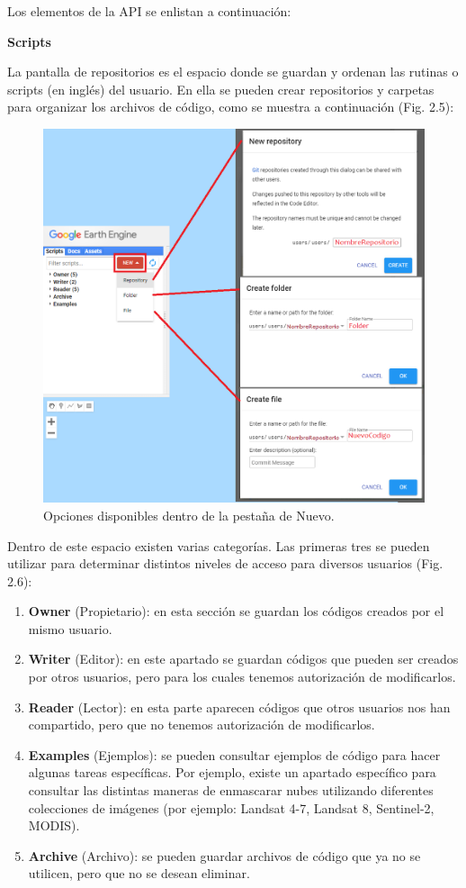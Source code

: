 \documentclass[
  12pt,
  letterpaper,
  twoside]{book}
\providecommand{\tightlist}{%
  \setlength{\itemsep}{0pt}\setlength{\parskip}{0pt}}
\begin{document}
Los elementos de la API se enlistan a continuación:

\textbf{Scripts}

La pantalla de repositorios es el espacio donde se guardan y ordenan las rutinas o scripts (en inglés) del usuario. En ella se pueden crear repositorios y carpetas para organizar los archivos de código, como se muestra a continuación (Fig. 2.5):

\begin{figure}[btp]

{\centering \includegraphics[width=0.8\linewidth]{Img/repofolderfile} 

}

\caption{Opciones disponibles dentro de la pestaña de Nuevo.}\label{fig:unnamed-chunk-6}
\end{figure}

Dentro de este espacio existen varias categorías. Las primeras tres se pueden utilizar para determinar distintos niveles de acceso para diversos usuarios (Fig. 2.6):

\begin{enumerate}
\def\labelenumi{\arabic{enumi}.}
\tightlist
\item
  \textbf{Owner} (Propietario): en esta sección se guardan los códigos creados por el mismo usuario.
\item
  \textbf{Writer} (Editor): en este apartado se guardan códigos que pueden ser creados por otros usuarios, pero para los cuales tenemos autorización de modificarlos.
\item
  \textbf{Reader} (Lector): en esta parte aparecen códigos que otros usuarios nos han compartido, pero que no tenemos autorización de modificarlos.
\item
  \textbf{Examples} (Ejemplos): se pueden consultar ejemplos de código para hacer algunas tareas específicas. Por ejemplo, existe un apartado específico para consultar las distintas maneras de enmascarar nubes utilizando diferentes colecciones de imágenes (por ejemplo: Landsat 4-7, Landsat 8, Sentinel-2, MODIS).
\item
  \textbf{Archive} (Archivo): se pueden guardar archivos de código que ya no se utilicen, pero que no se desean eliminar.
\end{enumerate}
\end{document}
